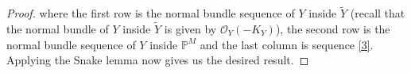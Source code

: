 \documentclass[11pt,twoside]{amsart}
\theoremstyle{plain}
\numberwithin{equation}{section}
\newtheorem{lemma}[theorem]{Lemma}
\theoremstyle{definition}
\begin{document}
\begin{proof}
where the first row is the normal bundle sequence of $Y$ inside $\widetilde{Y}$ (recall that the normal bundle of $Y$ inside $\widetilde{Y}$ is given by $\mathcal{O}_Y(-K_Y)$), the second row is the normal bundle sequence of $Y$ inside $\mathbb{P}^M$ and the last column is sequence \ref{3}. Applying the Snake lemma now gives us the desired result. 







\end{proof}
\end{document}
